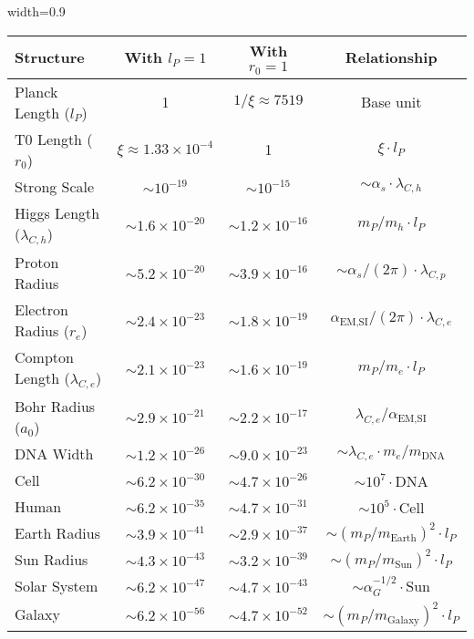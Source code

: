 \documentclass[12pt,a4paper]{article}
\newcommand{\alphaEMSI}{\alpha_{\text{EM,SI}}}
\newcommand{\tablescale}{0.9}
\begin{document}
	\begin{table}[H]
		\centering
		\begin{adjustbox}{width=\tablescale\textwidth}
			\begin{tabular}{lccc}
				\toprule
				\textbf{Structure} & \textbf{With \(l_P = 1\)} & \textbf{With \(r_0 = 1\)} & \textbf{Relationship} \\
				\midrule
				Planck Length (\(l_P\)) & 1 & \(1/\xi \approx 7519\) & Base unit \\
				T0 Length (\(r_0\)) & \(\xi \approx 1.33 \times 10^{-4}\) & 1 & \(\xi \cdot l_P\) \\
				Strong Scale & \(\sim 10^{-19}\) & \(\sim 10^{-15}\) & \(\sim \alpha_s \cdot \lambda_{C,h}\) \\
				Higgs Length (\(\lambda_{C,h}\)) & \(\sim 1.6 \times 10^{-20}\) & \(\sim 1.2 \times 10^{-16}\) & \(m_P/m_h \cdot l_P\) \\
				Proton Radius & \(\sim 5.2 \times 10^{-20}\) & \(\sim 3.9 \times 10^{-16}\) & \(\sim \alpha_s/(2\pi) \cdot \lambda_{C,p}\) \\
				Electron Radius (\(r_e\)) & \(\sim 2.4 \times 10^{-23}\) & \(\sim 1.8 \times 10^{-19}\) & \(\alphaEMSI/(2\pi) \cdot \lambda_{C,e}\) \\
				Compton Length (\(\lambda_{C,e}\)) & \(\sim 2.1 \times 10^{-23}\) & \(\sim 1.6 \times 10^{-19}\) & \(m_P/m_e \cdot l_P\) \\
				Bohr Radius (\(a_0\)) & \(\sim 2.9 \times 10^{-21}\) & \(\sim 2.2 \times 10^{-17}\) & \(\lambda_{C,e}/\alphaEMSI\) \\
				DNA Width & \(\sim 1.2 \times 10^{-26}\) & \(\sim 9.0 \times 10^{-23}\) & \(\sim \lambda_{C,e} \cdot m_e/m_{\text{DNA}}\) \\
				Cell & \(\sim 6.2 \times 10^{-30}\) & \(\sim 4.7 \times 10^{-26}\) & \(\sim 10^7 \cdot \text{DNA}\) \\
				Human & \(\sim 6.2 \times 10^{-35}\) & \(\sim 4.7 \times 10^{-31}\) & \(\sim 10^5 \cdot \text{Cell}\) \\
				Earth Radius & \(\sim 3.9 \times 10^{-41}\) & \(\sim 2.9 \times 10^{-37}\) & \(\sim (m_P/m_{\text{Earth}})^2 \cdot l_P\) \\
				Sun Radius & \(\sim 4.3 \times 10^{-43}\) & \(\sim 3.2 \times 10^{-39}\) & \(\sim (m_P/m_{\text{Sun}})^2 \cdot l_P\) \\
				Solar System & \(\sim 6.2 \times 10^{-47}\) & \(\sim 4.7 \times 10^{-43}\) & \(\sim \alpha_G^{-1/2} \cdot \text{Sun}\) \\
				Galaxy & \(\sim 6.2 \times 10^{-56}\) & \(\sim 4.7 \times 10^{-52}\) & \(\sim (m_P/m_{\text{Galaxy}})^2 \cdot l_P\) \\

\end{tabular}
\end{adjustbox}
\end{table}
\end{document}
